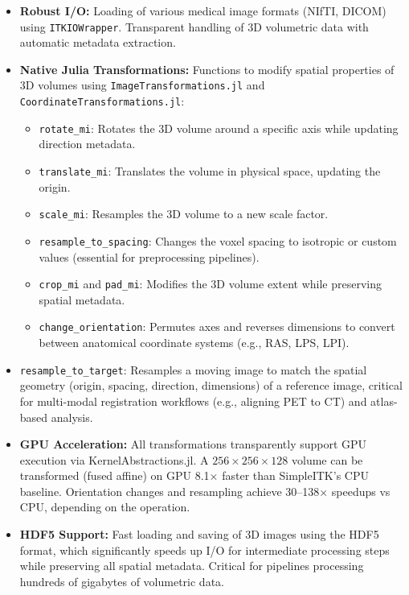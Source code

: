 \documentclass[a4paper,10pt]{elsarticle}
\begin{document}
  \begin{itemize}
      \item \textbf{Robust I/O:} Loading of various medical image formats (NIfTI, DICOM) using \texttt{ITKIOWrapper}. Transparent handling of 3D volumetric data with automatic metadata extraction.

      \item \textbf{Native Julia Transformations:} Functions to modify spatial properties of 3D volumes using \texttt{ImageTransformations.jl} and \texttt{CoordinateTransformations.jl}:
      \begin{itemize}
          \item \texttt{rotate\_mi}: Rotates the 3D volume around a specific axis while updating direction metadata.
          \item \texttt{translate\_mi}: Translates the volume in physical space, updating the origin.
          \item \texttt{scale\_mi}: Resamples the 3D volume to a new scale factor.
          \item \texttt{resample\_to\_spacing}: Changes the voxel spacing to isotropic or custom values (essential for preprocessing pipelines).
          \item \texttt{crop\_mi} and \texttt{pad\_mi}: Modifies the 3D volume extent while preserving spatial metadata.
          \item \texttt{change\_orientation}: Permutes axes and reverses dimensions to convert between anatomical coordinate systems (e.g., RAS, LPS, LPI).
      \end{itemize}
              \item \texttt{resample\_to\_target}: Resamples a moving image to match the spatial geometry (origin, spacing, direction, dimensions) of a reference image, critical for multi-modal registration workflows (e.g., aligning PET
  to CT) and atlas-based analysis.

      \item \textbf{GPU Acceleration:} All transformations transparently support GPU execution via KernelAbstractions.jl. A $256 \times 256 \times 128$ volume can be transformed (fused affine) on GPU 8.1× faster than SimpleITK's CPU baseline. Orientation changes and resampling achieve 30--138× speedups vs CPU,
  depending on the operation.

      \item \textbf{HDF5 Support:} Fast loading and saving of 3D images using the HDF5 format, which significantly speeds up I/O for intermediate processing steps while preserving all spatial metadata. Critical for pipelines processing
  hundreds of gigabytes of volumetric data.


\end{itemize}
\end{document}
